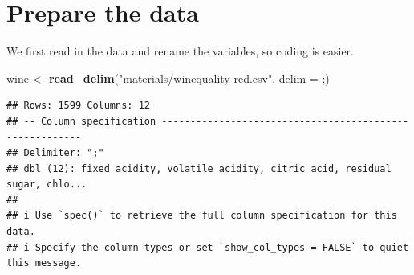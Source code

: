 \documentclass[
]{book}
\newenvironment{Shaded}{\begin{snugshade}}{\end{snugshade}}
\newcommand{\AttributeTok}[1]{\textcolor[rgb]{0.13,0.29,0.53}{#1}}
\newcommand{\FunctionTok}[1]{\textcolor[rgb]{0.13,0.29,0.53}{\textbf{#1}}}
\newcommand{\NormalTok}[1]{#1}
\newcommand{\OtherTok}[1]{\textcolor[rgb]{0.56,0.35,0.01}{#1}}
\newcommand{\StringTok}[1]{\textcolor[rgb]{0.31,0.60,0.02}{#1}}
\begin{document}
\hypertarget{prepare-the-data}{%
\section{Prepare the data}\label{prepare-the-data}}

We first read in the data and rename the variables, so coding is easier.

\begin{Shaded}
\begin{Highlighting}[]
\NormalTok{wine }\OtherTok{\textless{}{-}} \FunctionTok{read\_delim}\NormalTok{(}\StringTok{"materials/winequality{-}red.csv"}\NormalTok{, }\AttributeTok{delim =} \StringTok{\textquotesingle{};\textquotesingle{}}\NormalTok{)}
\end{Highlighting}
\end{Shaded}

\begin{verbatim}
## Rows: 1599 Columns: 12
## -- Column specification --------------------------------------------------------
## Delimiter: ";"
## dbl (12): fixed acidity, volatile acidity, citric acid, residual sugar, chlo...
## 
## i Use `spec()` to retrieve the full column specification for this data.
## i Specify the column types or set `show_col_types = FALSE` to quiet this message.
\end{verbatim}
\end{document}
